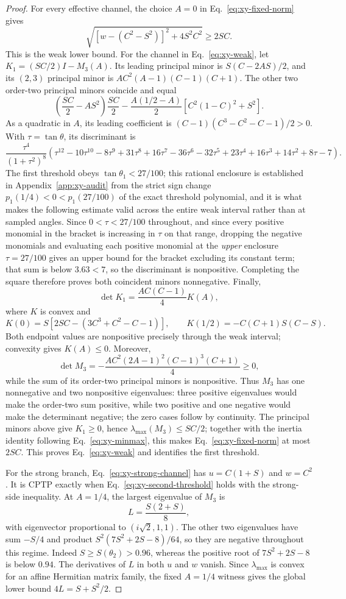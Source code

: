 \documentclass[11pt,a4paper]{article}
\theoremstyle{remark}
\begin{document}
\begin{proof}
For every effective channel, the choice $A=0$ in
Eq.~\eqref{eq:xy-fixed-norm} gives
\[
 \sqrt{[w-(C^2-S^2)]^2+4S^2C^2}\geq2SC.
\]
This is the weak lower bound.  For the channel in Eq.~\eqref{eq:xy-weak}, let
$K_1=(SC/2)I-M_3(A)$.  Its leading principal minor is
$S(C-2AS)/2$, and its $(2,3)$ principal minor is
$AC^2(A-1)(C-1)(C+1)$.  The other two order-two principal
minors coincide and equal
\[
 \left(\frac{SC}{2}-AS^2\right)\frac{SC}{2}
 -\frac{A(1/2-A)}{2}\left[C^2(1-C)^2+S^2\right].
\]
As a quadratic in $A$, its leading coefficient is
$(C-1)(C^3-C^2-C-1)/2>0$.  With $\tau=\tan\theta$, its discriminant is
\[
 \frac{\tau^4}{(1+\tau^2)^8}
 \left(\tau^{12}-10\tau^{10}-8\tau^9+31\tau^8+16\tau^7
 -36\tau^6-32\tau^5+23\tau^4+16\tau^3
 +14\tau^2+8\tau-7\right).
\]
The first threshold obeys $\tan\theta_1<27/100$; this rational enclosure is
established in Appendix~\ref{app:xy-audit} from the strict sign change
$p_1(1/4)<0<p_1(27/100)$ of the exact threshold polynomial, and it is what
makes the following estimate valid across the entire weak interval rather
than at sampled angles.  Since $0<\tau<27/100$ throughout, and since every
positive monomial in the bracket is increasing in $\tau$ on that range,
dropping the negative monomials and evaluating each positive monomial at the
\emph{upper} enclosure $\tau=27/100$ gives an upper bound for the bracket
excluding its constant term; that sum is below $3.63<7$, so the discriminant
is nonpositive.  Completing
the square therefore proves both coincident minors nonnegative.  Finally,
\[
 \det K_1=\frac{AC(C-1)}4K(A),
\]
where $K$ is convex and
\[
 K(0)=S[2SC-(3C^3+C^2-C-1)],\qquad
 K(1/2)=-C(C+1)S(C-S).
\]
Both endpoint values are nonpositive precisely through the weak interval;
convexity gives $K(A)\leq0$.  Moreover,
\[
 \det M_3=-\frac{AC^2(2A-1)^2(C-1)^3(C+1)}4\geq0,
\]
while the sum of its order-two principal minors is nonpositive.  Thus $M_3$
has one nonnegative and two nonpositive eigenvalues: three positive
eigenvalues would make the order-two sum positive, while two positive and one
negative would make the determinant negative; the zero cases follow by
continuity.  The principal minors
above give $K_1\geq0$, hence $\lambda_{\max}(M_3)\leq SC/2$; together with the
inertia identity following Eq.~\eqref{eq:xy-minmax}, this makes
Eq.~\eqref{eq:xy-fixed-norm} at most $2SC$.  This proves
Eq.~\eqref{eq:xy-weak} and identifies the first threshold.

For the strong branch, Eq.~\eqref{eq:xy-strong-channel} has
$u=C(1+S)$ and $w=C^2$.  It is CPTP exactly when
Eq.~\eqref{eq:xy-second-threshold} holds with the strong-side inequality.
At $A=1/4$, the largest eigenvalue of $M_3$ is
\[
 L=\frac{S(2+S)}8,
\]
with eigenvector proportional to $(i\sqrt2,1,1)$.  The other two eigenvalues
have sum $-S/4$ and product
$S^2(7S^2+2S-8)/64$, so they are negative throughout this regime.
Indeed $S\geq S(\theta_2)>0.96$, whereas the positive root of
$7S^2+2S-8$ is below $0.94$.  The derivatives of $L$ in both $u$ and $w$
vanish.  Since $\lambda_{\max}$ is convex for an affine Hermitian matrix
family, the fixed $A=1/4$ witness gives the global lower bound
$4L=S+S^2/2$.


\end{proof}
\end{document}
